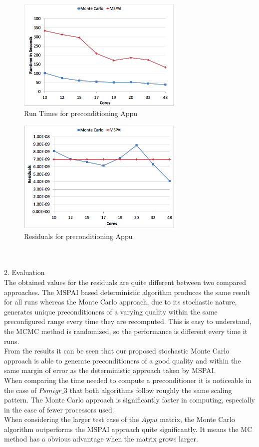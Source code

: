 \documentclass[10pt,journal]{IEEEtran}
\begin{document}
			\begin{figure}[htbp]
		\centering
		
		
			\includegraphics[width=8cm]{img/3}
			\caption[]{Run Times for preconditioning Appu}
		
		
	\end{figure}
		\begin{figure}[htbp]
		\centering
	
		
			\includegraphics[width=8cm]{img/4}
			\caption[]{Residuals for preconditioning Appu}
		
		
	\end{figure}
	\\\\
2. Evaluation\\
The obtained values for the residuals are quite different between two compared approaches. The MSPAI based deterministic algorithm produces the same result for all runs whereas the Monte Carlo approach, due to its stochastic nature, generates unique preconditioners of a varying quality within the same preconfigured range every time they are recomputed. This is easy to understand, the MCMC method is randomized, so the performance is different every time it runs.\\
From the results it can be seen that our proposed stochastic Monte Carlo approach is able to generate preconditioners of a good quality and within the same margin of error as the deterministic approach taken by MSPAI.\\
When comparing the time needed to compute a preconditioner it is noticeable in the case of $Psmigr\_3$ that both algorithms follow roughly the same scaling pattern. The Monte Carlo approach is significantly faster in computing, especially in the case of fewer processors used.\\
When considering the larger test case of the $Appu$ matrix, the Monte Carlo algorithm outperforms the MSPAI approach quite significantly. It means the MC method has a obvious advantage when the matrix grows larger.\\
\end{document}
